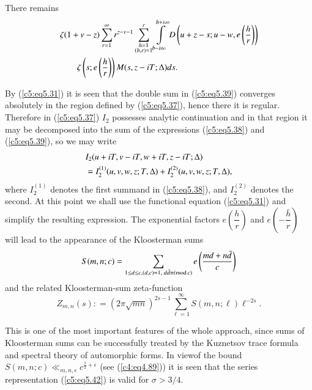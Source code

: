 There remains
\begin{align}
& \zeta (1+v-z) \sum\limits^\infty_{r=1} r^{z-v-1}
  \sum\limits^r_{\substack{h=1\\(h,r)=1}}
  \int\limits^{b+i\infty}_{b-i\infty} D\left(u+z-s;u -w , e
  \left(\frac{h}{r} \right) \right)\label{c5:eq5.39}\\  
& \qquad \zeta \left(s; e \left(\frac{h}{r}\right) \right) M (s, z
  -iT;\Delta) ds.\notag 
\end{align}

By (\ref{c5:eq5.31}) it is seen that the double sum in
(\ref{c5:eq5.39}) converges absolutely in the region defined by
(\ref{c5:eq5.37}), hence there it is regular. Therefore in
(\ref{c5:eq5.37}) $I_2$ possesses analytic continuation and in that
region it may be decomposed into the sum of the expressions
(\ref{c5:eq5.38}) and (\ref{c5:eq5.39}), so we may write 
\begin{align}
&I_2 (u+iT, v - iT, w + iT, z - iT;\Delta)\notag\\
& = I_2^{(1)}
(u,v,w,z;T,\Delta) + I^{(2)}_2 (u,v,w,z;T,\Delta),\label{c5:eq5.40} 
\end{align}
where $I^{(1)}_2$ denotes the first summand in (\ref{c5:eq5.38}), and
$I^{(2)}_2$ denotes the second. At this point we shall use the
functional equation (\ref{c5:eq5.31}) and simplify the resulting
expression. The exponential factors $e\left(\dfrac{h}{r} \right)$ and
$e\left( -\dfrac{\bar{h}}{r} \right)$ will lead to the appearance of
the Kloosterman sums 
\begin{equation}
S(m,n;c) = \sum\limits_{1 \leq d \leq c , (d,c) =1, \; d \bar{d}
  \equiv (\text{mod\,} c)} e \left(\frac{md + n\bar{d}}{c}
\right)\label{c5:eq5.41} 
\end{equation} 
and the related Kloosterman-sum zeta-function
\begin{equation}
Z_{m,n} (s) : = (2\pi \sqrt{mn})^{2s-1} \sum\limits^\infty_{\ell=1}
S(m,n;\ell) \ell^{-2s}.  
\label{c5:eq5.42}
\end{equation}

This is one of the most important features of the whole approach,
since sums of Kloosterman sums can be successfully treated by the
Kuznetsov trace formula and spectral theory of automorphic forms. In
view\pageoriginale of the bound $S(m,n;c) \ll_{m,n,\epsilon}
c^{\frac{1}{2} + \epsilon}$ (see (\ref{c4:eq4.89})) it is seen that
the series representation (\ref{c5:eq5.42}) is valid for $\sigma >
3/4$. 

